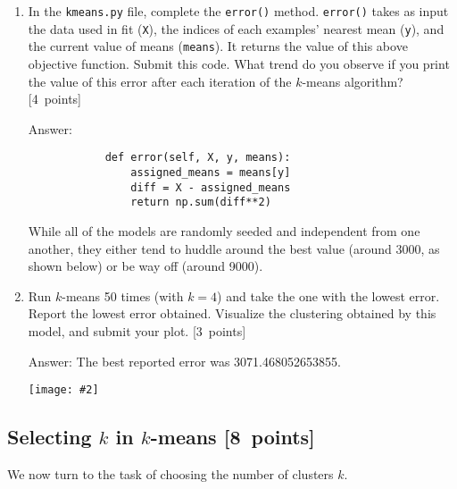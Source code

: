 \documentclass{article}
\newcommand{\blu}[1]{{\textcolor{blu}{#1}}}
\newenvironment{answer}{\par\begingroup\color{gre}Answer: }{\endgroup}
\let\ask\blu
\newcommand\pts[1]{\textcolor{pointscolour}{[#1~points]}}
\newcommand{\centerfig}[2]{\begin{center}\texttt{[image: \#2]}\end{center}}
\begin{document}
    \begin{enumerate}
        \item In the \texttt{kmeans.py} file, complete the \texttt{error()} method. \texttt{error()} takes as input the data used in fit (\texttt{X}), the indices of each examples' nearest mean (\texttt{y}), and the current value of means (\texttt{means}). It returns the value of this above objective function. \ask{Submit this code. What trend do you observe if you print the value of this error after each iteration of the $k$-means algorithm?} \pts{4}
        \begin{answer}
        \begin{verbatim}
            def error(self, X, y, means):
                assigned_means = means[y]
                diff = X - assigned_means
                return np.sum(diff**2)
        \end{verbatim}
        While all of the models are randomly seeded and independent from one another, they either tend to huddle around the best value (around 3000, as shown below) or be way off (around 9000).
        \end{answer}
        \item Run $k$-means 50 times (with $k=4$) and take the one with the lowest error. \ask{Report the lowest error obtained.} Visualize the clustering obtained by this model, and \ask{submit your plot}. \pts{3}
        \begin{answer}
        The best reported error was 3071.468052653855.
        \centerfig{.5}{figs/kmeans_5_1_lowest_error.png}
        \end{answer}
    \end{enumerate}


    \clearpage
    \subsection{Selecting $k$ in $k$-means \pts{8}}

    We now turn to the task of choosing the number of clusters $k$.
\end{document}
